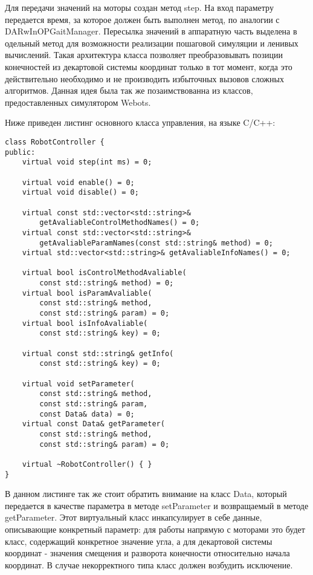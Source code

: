 Для передачи значений на моторы создан метод step. На вход параметру передается время, за которое должен быть выполнен метод, по аналогии с DARwInOPGaitManager. Пересылка значений в аппаратную часть выделена в одельный метод для возможности реализации пошаговой симуляции и ленивых вычислений. Такая архитектура класса позволяет преобразовывать позиции конечностей из декартовой системы координат только в тот момент, когда это действительно необходимо и не производить избыточных вызовов сложных алгоритмов. Данная идея была так же позаимствованна из классов, предоставленных симулятором Webots.

Ниже приведен листинг основного класса управления, на языке C/C++:

\lstset{language=C++}
\begin{lstlisting}
class RobotController {
public:
    virtual void step(int ms) = 0;

    virtual void enable() = 0;
    virtual void disable() = 0;

    virtual const std::vector<std::string>&
        getAvaliableControlMethodNames() = 0;
    virtual const std::vector<std::string>&
        getAvaliableParamNames(const std::string& method) = 0;
    virtual std::vector<std::string>& getAvaliableInfoNames() = 0;
    
    virtual bool isControlMethodAvaliable(
        const std::string& method) = 0;
    virtual bool isParamAvaliable(
        const std::string& method,
        const std::string& param) = 0;
    virtual bool isInfoAvaliable(
        const std::string& key) = 0;
    
    virtual const std::string& getInfo(
        const std::string& key) = 0;
        
    virtual void setParameter(
        const std::string& method,
        const std::string& param,
        const Data& data) = 0;
    virtual const Data& getParameter(
        const std::string& method,
        const std::string& param) = 0;
    
    virtual ~RobotController() { }
}
\end{lstlisting}

В данном листинге так же стоит обратить внимание на класс Data, который передается в качестве параметра в методе setParameter и возвращаемый в методе getParameter. Этот виртуальный класс инкапсулирует в себе данные, описывающие конкретный параметр: для работы напрямую с моторами это будет класс, содержащий конкретное значение угла, а для декартовой системы координат - значения смещения и разворота конечности относительно начала координат. В случае некорректного типа класс должен возбудить исключение.

